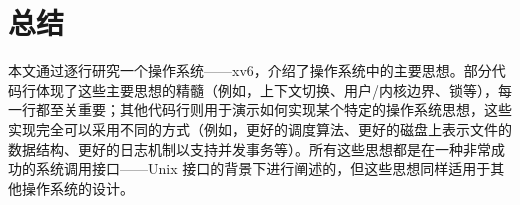 \chapter{总结}
\label{CH:SUM}

本文通过逐行研究一个操作系统——xv6，介绍了操作系统中的主要思想。部分代码行体现了这些主要思想的精髓（例如，上下文切换、用户/内核边界、锁等），每一行都至关重要；其他代码行则用于演示如何实现某个特定的操作系统思想，这些实现完全可以采用不同的方式（例如，更好的调度算法、更好的磁盘上表示文件的数据结构、更好的日志机制以支持并发事务等）。所有这些思想都是在一种非常成功的系统调用接口——Unix 接口的背景下进行阐述的，但这些思想同样适用于其他操作系统的设计。
